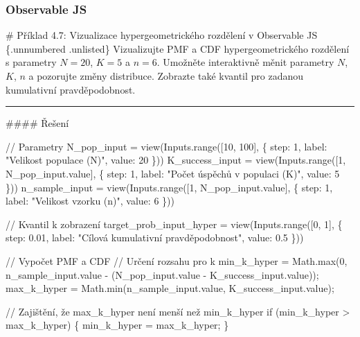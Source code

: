 \documentclass[
  czech,
  11pt,
  letterpaper,
  DIV=11,
  numbers=noendperiod]{scrreprt}
\newenvironment{Shaded}{\begin{snugshade}}{\end{snugshade}}
\newcommand{\NormalTok}[1]{\textcolor[rgb]{0.00,0.23,0.31}{#1}}
\begin{document}
\subsubsection*{Observable JS}\label{observable-js-3}

\begin{tcolorbox}[enhanced jigsaw, arc=.35mm, bottomrule=.15mm, bottomtitle=1mm, breakable, colback=white, colbacktitle=quarto-callout-note-color!10!white, colframe=quarto-callout-note-color-frame, coltitle=black, left=2mm, leftrule=.75mm, opacityback=0, opacitybacktitle=0.6, rightrule=.15mm, title=\textcolor{quarto-callout-note-color}{\faInfo}\hspace{0.5em}{Poznámka}, titlerule=0mm, toprule=.15mm, toptitle=1mm]

\# Příklad 4.7: Vizualizace hypergeometrického rozdělení v Observable JS
\{.unnumbered .unlisted\} Vizualizujte PMF a CDF hypergeometrického
rozdělení s parametry \(N=20\), \(K=5\) a \(n=6\). Umožněte interaktivně
měnit parametry \(N\), \(K\), \(n\) a pozorujte změny distribuce.
Zobrazte také kvantil pro zadanou kumulativní pravděpodobnost.

\begin{center}\rule{0.5\linewidth}{0.5pt}\end{center}

\#\#\#\# Řešení

\begin{Shaded}
\begin{Highlighting}[]
\NormalTok{// Parametry}
\NormalTok{N\_pop\_input = view(Inputs.range([10, 100], \{ step: 1, label: "Velikost populace (N)", value: 20 \}))}
\NormalTok{K\_success\_input = view(Inputs.range([1, N\_pop\_input.value], \{ step: 1, label: "Počet úspěchů v populaci (K)", value: 5 \}))}
\NormalTok{n\_sample\_input = view(Inputs.range([1, N\_pop\_input.value], \{ step: 1, label: "Velikost vzorku (n)", value: 6 \}))}

\NormalTok{// Kvantil k zobrazení}
\NormalTok{target\_prob\_input\_hyper = view(Inputs.range([0, 1], \{ step: 0.01, label: "Cílová kumulativní pravděpodobnost", value: 0.5 \}))}

\NormalTok{// Vypočet PMF a CDF}
\NormalTok{// Určení rozsahu pro k}
\NormalTok{min\_k\_hyper = Math.max(0, n\_sample\_input.value {-} (N\_pop\_input.value {-} K\_success\_input.value));}
\NormalTok{max\_k\_hyper = Math.min(n\_sample\_input.value, K\_success\_input.value);}

\NormalTok{// Zajištění, že max\_k\_hyper není menší než min\_k\_hyper}
\NormalTok{if (min\_k\_hyper \textgreater{} max\_k\_hyper) \{}
\NormalTok{    min\_k\_hyper = max\_k\_hyper;}
\NormalTok{\}}


\end{Highlighting}
\end{Shaded}
\end{tcolorbox}
\end{document}
